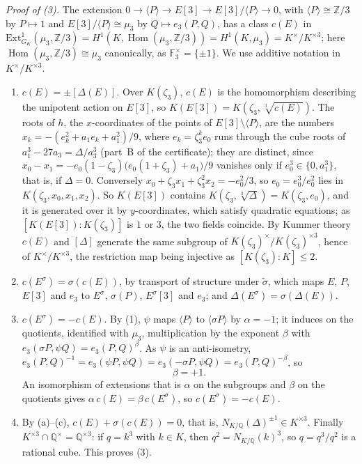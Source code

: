 \documentclass[11pt]{article}
\newcommand{\Q}{\mathbb Q}
\newcommand{\Z}{\mathbb Z}
\newcommand{\F}{\mathbb F}
\DeclareMathOperator{\Hom}{Hom}
\begin{document}
\emph{Proof of (3).} The extension
\(0\to\langle P\rangle\to E[3]\to E[3]/\langle P\rangle\to0\), with \(\langle P\rangle\cong\Z/3\) by
\(P\mapsto1\) and \(E[3]/\langle P\rangle\cong\mu_3\) by \(Q\mapsto e_3(P,Q)\), has a class
\(c(E)\) in \(\mathrm{Ext}^1_{G_K}(\mu_3,\Z/3)=H^1(K,\Hom(\mu_3,\Z/3))=H^1(K,\mu_3)=K^\times/K^{\times3}\);
here \(\Hom(\mu_3,\Z/3)\cong\mu_3\) canonically, as \(\F_3^\times=\{\pm1\}\). We use additive notation in
\(K^\times/K^{\times3}\).
\begin{enumerate}
\item[(a)] \(c(E)=\pm[\Delta(E)]\). Over \(K(\zeta_3)\), \(c(E)\) is the homomorphism describing the
unipotent action on \(E[3]\), so \(K(E[3])=K(\zeta_3,\sqrt[3]{c(E)})\). The roots of \(h\), the
\(x\)-coordinates of the points of \(E[3]\setminus\langle P\rangle\), are the numbers
\(x_k=-(e_k^2+a_1e_k+a_1^2)/9\), where \(e_k=\zeta_3^ke_0\) runs through the cube roots of
\(a_1^3-27a_3=\Delta/a_3^3\) (part~B of the certificate); they are distinct, since
\(x_0-x_1=-e_0(1-\zeta_3)\bigl(e_0(1+\zeta_3)+a_1\bigr)/9\) vanishes only if \(e_0^3\in\{0,a_1^3\}\),
that is, if \(\Delta=0\). Conversely
\(x_0+\zeta_3x_1+\zeta_3^2x_2=-e_0^2/3\), so \(e_0=e_0^3/e_0^2\) lies in \(K(\zeta_3,x_0,x_1,x_2)\).
So \(K(E[3])\) contains \(K(\zeta_3,\sqrt[3]\Delta)=K(\zeta_3,e_0)\), and it is generated over it by
\(y\)-coordinates, which satisfy quadratic equations; as \([K(E[3]):K(\zeta_3)]\) is \(1\) or \(3\), the two fields coincide. By
Kummer theory \(c(E)\) and \([\Delta]\) generate the same subgroup of
\(K(\zeta_3)^\times/K(\zeta_3)^{\times3}\), hence of \(K^\times/K^{\times3}\), the restriction map
being injective as \([K(\zeta_3):K]\le2\).
\item[(b)] \(c(E^\sigma)=\sigma(c(E))\), by transport of structure under \(\tilde\sigma\), which maps
\(E\), \(P\), \(E[3]\) and \(e_3\) to \(E^\sigma\), \(\sigma(P)\), \(E^\sigma[3]\) and \(e_3\); and
\(\Delta(E^\sigma)=\sigma(\Delta(E))\).
\item[(c)] \(c(E^\sigma)=-c(E)\). By (1), \(\psi\) maps \(\langle P\rangle\) to \(\langle\sigma P\rangle\)
by \(\alpha=-1\); it induces on the quotients, identified with \(\mu_3\), multiplication by the exponent
\(\beta\) with \(e_3(\sigma P,\psi Q)=e_3(P,Q)^\beta\). As \(\psi\) is an anti-isometry,
\(e_3(P,Q)^{-1}=e_3(\psi P,\psi Q)=e_3(-\sigma P,\psi Q)=e_3(P,Q)^{-\beta}\), so
\[\beta=+1.\]
An isomorphism of extensions that is \(\alpha\) on the subgroups and \(\beta\) on the quotients gives
\(\alpha\,c(E)=\beta\,c(E^\sigma)\), so \(c(E^\sigma)=-c(E)\).
\item[(d)] By (a)--(c), \(c(E)+\sigma(c(E))=0\), that is, \(N_{K/\Q}(\Delta)^{\pm1}\in K^{\times3}\).
Finally \(K^{\times3}\cap\Q^\times=\Q^{\times3}\): if \(q=k^3\) with \(k\in K\), then
\(q^2=N_{K/\Q}(k)^3\), so \(q=q^3/q^2\) is a rational cube. This proves (3).
\end{enumerate}
\end{document}
